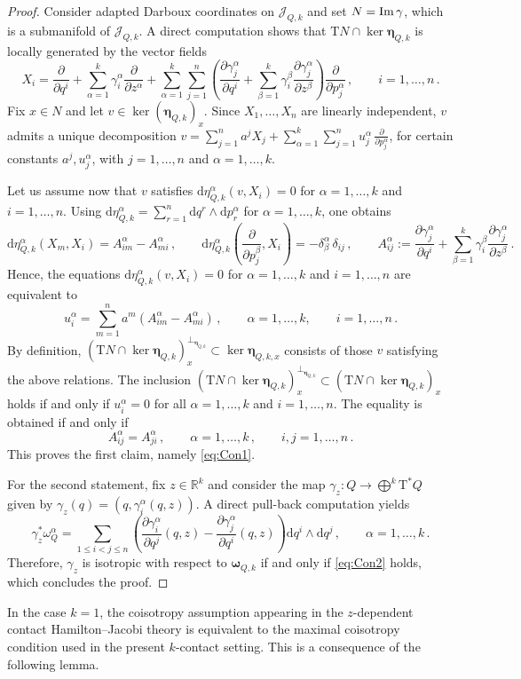 \documentclass[11pt,twoside]{article}
\theoremstyle{plain}
\theoremstyle{definition}
\theoremstyle{remark}
\newcommand{\dd}{\mathrm{d}}
\newcommand{\T}{\mathrm{T}}
\begin{document}
\begin{proof}
Consider adapted Darboux coordinates on \(\mathcal{J}_{Q,k}\) and set \(N={\rm Im}\,\gamma\), which is a submanifold of \(\mathcal{J}_{Q,k}\). A direct computation shows that \(\T N\cap\ker\bm \eta_{Q,k}\) is locally generated by the vector fields
\[
X_i=\frac{\partial}{\partial q^{i}}+\sum_{\alpha=1}^k \gamma_{i}^{\alpha}\frac{\partial}{\partial z^{\alpha}}+\sum_{\alpha=1}^k\sum_{j=1}^n\left(\frac{\partial \gamma_{j}^{\alpha}}{\partial q^{i}}+\sum_{\beta=1}^k \gamma_{i}^{\beta}\frac{\partial \gamma_{j}^{\alpha}}{\partial z^{\beta}}\right)\frac{\partial}{\partial p_{j}^{\alpha}}\,,\qquad i=1,\dots,n\,.
\]
Fix \(x\in N\) and let \(v\in\ker (\bm\eta_{Q,k})_x\). Since \(X_1,\dotsc,X_n\) are linearly independent, \(v\) admits a unique decomposition \(v=\sum_{j=1}^n a^j X_j+\sum_{\alpha=1}^k\sum_{j=1}^n u_j^\alpha\,\frac{\partial}{\partial p_j^\alpha}\), for certain constants \(a^j,u^\alpha_j\), with \(j=1,\dotsc,n\) and \(\alpha=1,\dotsc,k\).

Let us assume now that \(v\) satisfies \(\dd\eta^\alpha_{Q,k}(v,X_i)=0\) for \(\alpha=1,\dots,k\) and \(i=1,\dots,n\). Using \(\dd\eta^\alpha_{Q,k}=\sum_{r=1}^n\dd q^r\wedge \dd p_r^\alpha\) for \(\alpha=1,\dotsc,k\), one obtains
\[
\dd\eta^\alpha_{Q,k}(X_m,X_i)=A_{im}^\alpha-A_{mi}^\alpha\,,\qquad \dd\eta^\alpha_{Q,k}\!\left(\frac{\partial}{\partial p_j^\beta},X_i\right)=-\delta^\alpha_\beta\,\delta_{ij}\,,\qquad A_{ij}^\alpha:=\frac{\partial \gamma_{j}^{\alpha}}{\partial q^{i}}+\sum_{\beta=1}^k \gamma_{i}^{\beta}\frac{\partial \gamma_{j}^{\alpha}}{\partial z^{\beta}}\,.
\]
Hence, the equations \(\dd\eta^\alpha_{Q,k}(v,X_i)=0\) for \(\alpha=1,\dotsc,k\) and \(i=1,\dotsc,n\) are equivalent to
\[
u_i^\alpha=\sum_{m=1}^n a^m(A_{im}^\alpha-A_{mi}^\alpha)\,,\qquad \alpha=1,\dotsc,k,\qquad i=1,\dotsc,n\,.
\]
By definition, \((\T N\cap \ker \bm\eta_{Q,k})_x^{\perp_{\bm\eta_{Q,k}}}\subset\ker \bm\eta_{Q,k,x}\) consists of those \(v\) satisfying the above relations. The inclusion \((\T N\cap \ker \bm\eta_{Q,k})_x^{\perp_{\bm\eta_{Q,k}}}\subset (\T N\cap \ker \bm\eta_{Q,k})_x\) holds if and only if \(u_i^\alpha=0\) for all \(\alpha=1,\dotsc,k\) and \(i=1,\dotsc,n\). The equality is obtained if and only if
\[
A_{ij}^\alpha=A_{ji}^\alpha\,,\qquad \alpha=1,\dots,k\,,\qquad i,j=1,\dots,n\,.
\]
This proves the first claim, namely \eqref{eq:Con1}.

For the second statement, fix \(z\in\mathbb R^k\) and consider the map \(\gamma_z\colon Q\to\bigoplus^k \T^*Q\) given by \(\gamma_z(q)=(q,\gamma_i^\alpha(q,z))\). A direct pull-back computation yields
\[
\gamma_z^*\omega_Q^\alpha=\sum_{1\leq i<j\leq n}\left(\frac{\partial \gamma_i^\alpha}{\partial q^j}(q,z)-\frac{\partial \gamma_j^\alpha}{\partial q^i}(q,z)\right)\dd q^i\wedge \dd q^j\,,\qquad \alpha=1,\dotsc,k\,.
\]
Therefore, \(\gamma_z\) is isotropic with respect to \(\bm\omega_{Q,k}\) if and only if \eqref{eq:Con2} holds, which concludes the proof.
\end{proof}
In the case $k=1$, the coisotropy assumption appearing in the $z$-dependent contact Hamilton--Jacobi theory is equivalent to the maximal coisotropy condition used in the present $k$-contact setting. This is a consequence of the following lemma.
\end{document}

